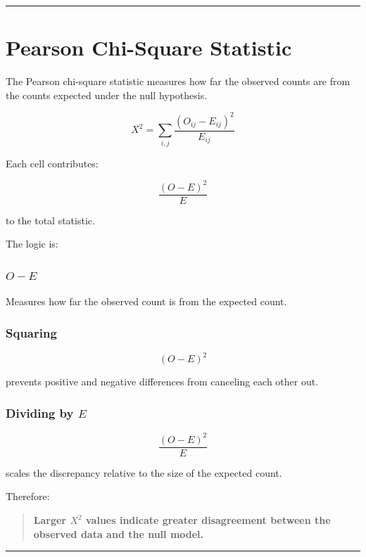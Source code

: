 \documentclass[
  letterpaper,
  DIV=11,
  numbers=noendperiod]{scrreprt}
\begin{document}
\begin{center}\rule{0.5\linewidth}{0.5pt}\end{center}


\chapter{Pearson Chi-Square
Statistic}\label{pearson-chi-square-statistic}

The Pearson chi-square statistic measures how far the observed counts
are from the counts expected under the null hypothesis.

\[
\boxed{
X^2
=
\sum_{i,j}
\frac{
(O_{ij}-E_{ij})^2
}{
E_{ij}
}
}
\]

Each cell contributes:

\[
\frac{(O-E)^2}{E}
\]

to the total statistic.

The logic is:

\subsection{\texorpdfstring{\(O-E\)}{O-E}}\label{o-e}

Measures how far the observed count is from the expected count.

\subsection{Squaring}\label{squaring}

\[
(O-E)^2
\]

prevents positive and negative differences from canceling each other
out.

\subsection{\texorpdfstring{Dividing by
\(E\)}{Dividing by E}}\label{dividing-by-e}

\[
\frac{(O-E)^2}{E}
\]

scales the discrepancy relative to the size of the expected count.

Therefore:

\begin{quote}
\textbf{Larger \(X^2\) values indicate greater disagreement between the
observed data and the null model.}
\end{quote}

\begin{center}\rule{0.5\linewidth}{0.5pt}\end{center}
\end{document}
